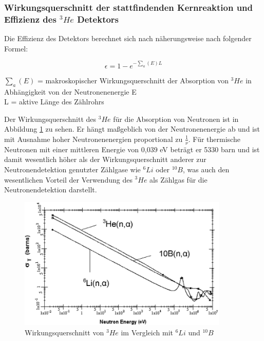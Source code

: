 \subsubsection{Wirkungsquerschnitt der stattfindenden Kernreaktion und Effizienz des $^3He$ Detektors}
Die Effizienz des Detektors berechnet sich nach näherungsweise nach folgender Formel:

\begin{equation}
	\epsilon = 1-e^{-\sum_{a} (E) L}
\end{equation}

$ \sum_{a} (E) $ = makroskopischer Wirkungsquerschnitt der Absorption von $^3He$ in Abhängigkeit von der Neutronenenergie E \\ %
L = aktive Länge des Zählrohrs

Der Wirkungsquerschnitt des $^3He$ für die Absorption von Neutronen ist in Abbildung \ref{crosssection_He_3} zu sehen. Er hängt maßgeblich von der Neutronenenergie ab und ist mit Ausnahme hoher Neutronenenergien proportional zu $\frac{1}{\nu}$. Für thermische Neutronen mit einer mittleren Energie von 0,039 eV beträgt er 5330 barn und ist damit wesentlich höher als der Wirkungsquerschnitt anderer zur Neutronendetektion genutzter Zählgase wie $^6Li$ oder $^{10}B$, was auch den wesentlichen Vorteil der Verwendung des $^3He$ als Zählgas für die Neutronendetektion darstellt. 
 
\begin{figure} [!htb]
	\includegraphics [width=10cm] {pics/cross_section_He3_B10_Li_6.png}
	\centering
	\caption {Wirkungsquerschnitt von $^3He$ im Vergleich mit $^6Li$ und $^{10}B$ \protect\footnotemark }
	\label{crosssection_He_3}
\end{figure}

